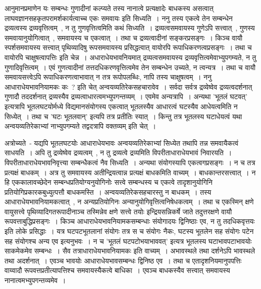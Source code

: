 		आनुमानप्रमाणेन यः सम्बन्धः गुणादीनां कल्प्यते तस्य नानात्वे प्रत्यक्षादेः बाधकस्य असत्वात् लाघवज्ञानसहकृतपरामर्शकार्यत्वाच्च एकः समवायः इति सिध्यति~। ननु तस्य एकत्वे तेन सम्बन्धेन द्रव्यत्वस्य द्रव्यवृत्तित्वम्~, न तु गुणवृत्तित्वमिति कथं सिध्यति~। द्रव्यत्वसमवायस्य गुणेऽपि सत्त्वात्~, गुणस्य समवायानुयोगित्वात्~, समवायस्य च एकत्वात्~। तथा च द्रव्यत्वादीनां सङ्करप्रसङ्गः~। किञ्च वायौ स्पर्शसमवायस्य सत्त्वात् पृथिव्यादिषु रूपसमवायस्य प्रसिद्धत्वात् वायोरपि रूपाधिकरणत्वप्रसङ्गः~। तथा च वायोरपि चाक्षुषत्वापत्तिः इति चेन्न~। अधाराधेयभावनियमात् द्रव्यत्वसमवायस्य द्रव्यवृत्तित्वमेवाभ्युपगम्यते, न तु गुणादिवृत्तित्वम्~। एवं गुणत्वादीनां तत्तदधिकरणवृत्तित्वमेव तेन सम्बन्धेन उच्यते, न त्वन्यत्र~। तथा च वायौ समवायसत्त्वेऽपि रूपाधिकरणत्वाभावात् न तत्र रूपोपलब्धिः, नापि तस्य चाक्षुषत्वम्~। ननु आधाराधेयभावनियामकः कः~? इति चेत् अन्वयव्यतिरेकसहचारावेव~। सर्वदा सर्वत्र द्रव्येष्वेव द्रव्यत्वदर्शनात् गुणादौ तददर्शनात् द्रव्यस्यैव द्रव्यत्वाधारत्वमभ्युपगन्तव्यम्~। एवमेव अन्यत्रापि~। अन्यथा 'भूतलं घटवत्' इत्यत्रापि भूतलघटयोर्मध्ये विद्यमानसंयोगस्य एकत्वात् भूतलस्यैव आधारत्वं घटस्यैव आधेयत्वमिति न सिध्येत्~। तथा च 'घटः भूतलवान्' इत्यपि तत्र प्रतीतिः स्यात्~। किन्तु तत्र भूतलस्य घटाधेयत्वं यथा अन्वयव्यतिरेकाभ्यां नाभ्युपगम्यते तद्वदत्रापि वक्तव्यम् इति चेत्~।

		अत्रोच्यते~- यद्यपि भूतलघटयोः आधाराधेयभावः अन्वयव्यतिरेकाभ्यां सिध्येत तथापि तन्न समवायैकत्वं साधयति~। अपि तु द्रव्येष्वेव द्रव्यत्वम्~, न तु द्रव्यत्वे द्रव्यमिति विपरीताधाराधेयभावं निवारयति~। विपरीताधाराधेयभावनिवृत्त्या सम्बन्धैकत्वं नैव सिध्यति~। अन्यथा संयोगस्यापि एकत्वगप्रसङ्गः~। न च तत्र प्रत्यक्षं बाधकम्~। अत्र तु समवायस्य अतीन्द्रियत्वान्न प्रत्यक्षं बाधकमिति वाच्यम्~। बाधकान्तरसत्त्वात्~। न हि एककालावच्छेदेन सम्बन्धप्रतियोग्यनुयोगिनोः सत्त्वे सम्बन्धस्य च एकत्वे तादृशानुयोगिनि प्रतियोगिप्रकारकबुध्युत्पत्तौ बाधकमस्ति~। अन्वयव्यतिरेकसहचारस्तु न बाधकम्~। तस्य आधाराधेयभावनियामकत्वात्~, न अन्यप्रतियोगिनः अन्यानुयोगिवृत्तित्वनिषेधकत्वम्~। तथा च एकस्मिन् क्षणे वायुसत्त्वे पृथिव्यादिगतरूपादीनाञ्च तस्मिन्नेव क्षणे सत्त्वे तयोः इन्द्रियसन्निकर्षे जाते तदुत्तरक्षणे वायौ रूपवत्ताबुद्धिप्रसङ्गः~। किञ्च आधाराधेयभावनियामकसम्बन्धाः संयोगादयः द्विनिष्ठाः एव, न तु तदधिकवृत्तयः इति लोके प्रसिद्धाः~। यत्र घटपटभूतलानां संयोगः तत्र स च संयोगः नैकः, घटस्य भूतलेन सह संयोगः पटेन सह संयोगश्च अन्य एव इत्यनुभवः~। न च 'भूतलं घटपटोभयाभाववत्' इत्यत्र भूतलस्य घटाभावपटाभावयोः साकमेकमेव सम्बन्धः~। सैव तत्राधाराधेयभावनियामकः इति वाच्यम्~। अभावस्थले तथा दर्शनेऽपि भावस्थले तथा अदर्शनात्~। एवञ्च भावयोः आधाराधेयभावसम्बन्धः द्विनिष्ठ एव~। तथा च एतादृशनियमानुपपत्तिः वाय्वादौ रूपवत्तप्रतीत्यापत्तिश्च समवायस्यैकत्वे बाधिका~। एवञ्च बाधकस्यैव सत्त्वात् समवायस्य नानात्वमभ्युपगन्तव्यमेव~।


